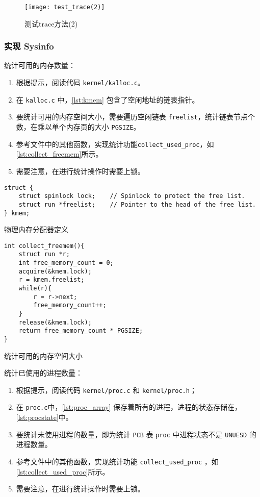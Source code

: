 \begin{figure}[!htb]
	\centering
	\texttt{[image: test\_trace(2)]}
	\caption{测试trace方法(2)}
	\label{fig:test_trace(2)}
\end{figure}

\subsubsection{实现 Sysinfo}

统计可用的内存数量：

\begin{enumerate}
	\item 根据提示，阅读代码 \texttt{kernel/kalloc.c}。
	\item 在 \texttt{kalloc.c} 中，\cref{lst:kmem} 包含了空闲地址的链表指针。
	\item 要统计可用的内存空间大小，需要遍历空闲链表 \texttt{freelist}，统计链表节点个数，在乘以单个内存页的大小 \texttt{PGSIZE}。
	\item 参考文件中的其他函数，实现统计功能\texttt{collect\_used\_proc}，如\cref{lst:collect_freemem}所示。
	\item 需要注意，在进行统计操作时需要上锁。
\end{enumerate}

\begin{listing}[!htb]
	\begin{verbatim}
struct {
    struct spinlock lock;    // Spinlock to protect the free list.
    struct run *freelist;    // Pointer to the head of the free list.
} kmem;
	\end{verbatim}
	\caption{物理内存分配器定义}\label{lst:kmem}
\end{listing}

\begin{listing}[!htb]
	\begin{verbatim}
int collect_freemem(){
    struct run *r;
    int free_memory_count = 0;
    acquire(&kmem.lock);
    r = kmem.freelist;
    while(r){
        r = r->next;
        free_memory_count++;
    }
    release(&kmem.lock);
    return free_memory_count * PGSIZE;
}
	\end{verbatim}
	\caption{统计可用的内存空间大小}\label{lst:collect_freemem}
\end{listing}

统计已使用的进程数量：

\begin{enumerate}
	\item 根据提示，阅读代码 \texttt{kernel/proc.c} 和 \texttt{kernel/proc.h}；
	\item 在 \texttt{proc.c}中，\cref{lst:proc_array} 保存着所有的进程，进程的状态存储在，\cref{lst:procstate}中。
	\item 要统计未使用进程的数量，即为统计 \texttt{PCB} 表 \texttt{proc} 中进程状态不是 \texttt{UNUESD} 的进程数量。
	\item 参考文件中的其他函数，实现统计功能 \texttt{collect\_used\_proc} ，如\cref{lst:collect_used_proc}所示。
	\item 需要注意，在进行统计操作时需要上锁。
\end{enumerate}

